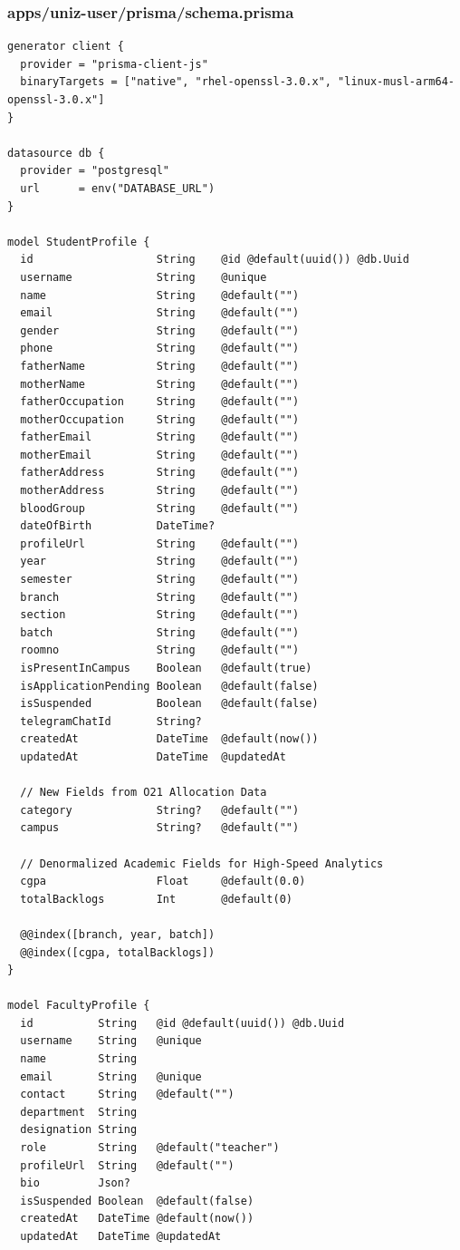 \documentclass[11pt,a4paper,oneside]{article}
\begin{document}
\subsubsection*{apps/uniz-user/prisma/schema.prisma}
\begin{lstlisting}
generator client {
  provider = "prisma-client-js"
  binaryTargets = ["native", "rhel-openssl-3.0.x", "linux-musl-arm64-openssl-3.0.x"]
}

datasource db {
  provider = "postgresql"
  url      = env("DATABASE_URL")
}

model StudentProfile {
  id                   String    @id @default(uuid()) @db.Uuid
  username             String    @unique
  name                 String    @default("")
  email                String    @default("")
  gender               String    @default("")
  phone                String    @default("")
  fatherName           String    @default("")
  motherName           String    @default("")
  fatherOccupation     String    @default("")
  motherOccupation     String    @default("")
  fatherEmail          String    @default("")
  motherEmail          String    @default("")
  fatherAddress        String    @default("")
  motherAddress        String    @default("")
  bloodGroup           String    @default("")
  dateOfBirth          DateTime?
  profileUrl           String    @default("")
  year                 String    @default("")
  semester             String    @default("")
  branch               String    @default("")
  section              String    @default("")
  batch                String    @default("")
  roomno               String    @default("")
  isPresentInCampus    Boolean   @default(true)
  isApplicationPending Boolean   @default(false)
  isSuspended          Boolean   @default(false)
  telegramChatId       String?
  createdAt            DateTime  @default(now())
  updatedAt            DateTime  @updatedAt

  // New Fields from O21 Allocation Data
  category             String?   @default("")
  campus               String?   @default("")

  // Denormalized Academic Fields for High-Speed Analytics
  cgpa                 Float     @default(0.0)
  totalBacklogs        Int       @default(0)

  @@index([branch, year, batch])
  @@index([cgpa, totalBacklogs])
}

model FacultyProfile {
  id          String   @id @default(uuid()) @db.Uuid
  username    String   @unique
  name        String
  email       String   @unique
  contact     String   @default("")
  department  String
  designation String
  role        String   @default("teacher")
  profileUrl  String   @default("")
  bio         Json?
  isSuspended Boolean  @default(false)
  createdAt   DateTime @default(now())
  updatedAt   DateTime @updatedAt


\end{lstlisting}
\end{document}
